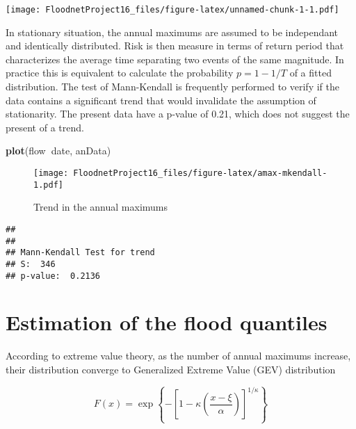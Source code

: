 \documentclass[]{book}
\newenvironment{Shaded}{\begin{snugshade}}{\end{snugshade}}
\newcommand{\KeywordTok}[1]{\textcolor[rgb]{0.13,0.29,0.53}{\textbf{#1}}}
\newcommand{\NormalTok}[1]{#1}
\newcommand{\OperatorTok}[1]{\textcolor[rgb]{0.81,0.36,0.00}{\textbf{#1}}}
\theoremstyle{definition}
\theoremstyle{definition}
\theoremstyle{definition}
\theoremstyle{remark}
\begin{document}
\texttt{[image: FloodnetProject16\_files/figure-latex/unnamed-chunk-1-1.pdf]}

In stationary situation, the annual maximums are assumed to be
independant and identically distributed. Risk is then measure in terms
of return period that characterizes the average time separating two
events of the same magnitude. In practice this is equivalent to
calculate the probability \(p = 1-1/T\) of a fitted distribution. The
test of Mann-Kendall is frequently performed to verify if the data
contains a significant trend that would invalidate the assumption of
stationarity. The present data have a p-value of 0.21, which does not
suggest the present of a trend.

\begin{Shaded}
\begin{Highlighting}[]
\KeywordTok{plot}\NormalTok{(flow}\OperatorTok{~}\NormalTok{date, anData)}
\end{Highlighting}
\end{Shaded}

\begin{figure}
\centering
\texttt{[image: FloodnetProject16\_files/figure-latex/amax-mkendall-1.pdf]}
\caption{\label{fig:amax-mkendall}Trend in the annual maximums}
\end{figure}

\begin{Shaded}
\end{Shaded}

\begin{verbatim}
## 
## 
## Mann-Kendall Test for trend
## S:  346
## p-value:  0.2136
\end{verbatim}

\hypertarget{estimation-of-the-flood-quantiles}{%
\section{Estimation of the flood
quantiles}\label{estimation-of-the-flood-quantiles}}

According to extreme value theory, as the number of annual maximums
increase, their distribution converge to Generalized Extreme Value (GEV)
distribution

\begin{equation}
F(x) = \exp\left\{ - \left[ 1 - \kappa \left(\frac{x-\xi}{\alpha} \right) \right]^{1/\kappa} \right\}
\label{eq:amax-gevcdf}
\end{equation}
\end{document}
